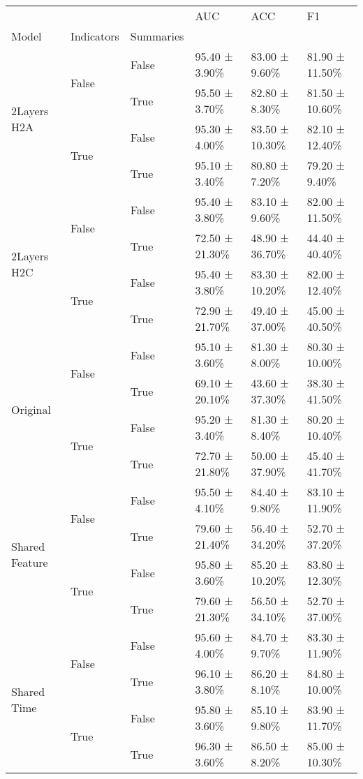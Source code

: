 \begin{tabular}{llllll}
\toprule
 &  &  & AUC & ACC & F1 \\
Model & Indicators & Summaries &  &  &  \\
\midrule
\multirow[t]{4}{*}{2Layers H2A} & \multirow[t]{2}{*}{False} & False & 95.40 ± 3.90\% & 83.00 ± 9.60\% & 81.90 ± 11.50\% \\
 &  & True & 95.50 ± 3.70\% & 82.80 ± 8.30\% & 81.50 ± 10.60\% \\
\cline{2-6}
 & \multirow[t]{2}{*}{True} & False & 95.30 ± 4.00\% & 83.50 ± 10.30\% & 82.10 ± 12.40\% \\
 &  & True & 95.10 ± 3.40\% & 80.80 ± 7.20\% & 79.20 ± 9.40\% \\
\cline{1-6} \cline{2-6}
\multirow[t]{4}{*}{2Layers H2C} & \multirow[t]{2}{*}{False} & False & 95.40 ± 3.80\% & 83.10 ± 9.60\% & 82.00 ± 11.50\% \\
 &  & True & 72.50 ± 21.30\% & 48.90 ± 36.70\% & 44.40 ± 40.40\% \\
\cline{2-6}
 & \multirow[t]{2}{*}{True} & False & 95.40 ± 3.80\% & 83.30 ± 10.20\% & 82.00 ± 12.40\% \\
 &  & True & 72.90 ± 21.70\% & 49.40 ± 37.00\% & 45.00 ± 40.50\% \\
\cline{1-6} \cline{2-6}
\multirow[t]{4}{*}{Original} & \multirow[t]{2}{*}{False} & False & 95.10 ± 3.60\% & 81.30 ± 8.00\% & 80.30 ± 10.00\% \\
 &  & True & 69.10 ± 20.10\% & 43.60 ± 37.30\% & 38.30 ± 41.50\% \\
\cline{2-6}
 & \multirow[t]{2}{*}{True} & False & 95.20 ± 3.40\% & 81.30 ± 8.40\% & 80.20 ± 10.40\% \\
 &  & True & 72.70 ± 21.80\% & 50.00 ± 37.90\% & 45.40 ± 41.70\% \\
\cline{1-6} \cline{2-6}
\multirow[t]{4}{*}{Shared Feature} & \multirow[t]{2}{*}{False} & False & 95.50 ± 4.10\% & 84.40 ± 9.80\% & 83.10 ± 11.90\% \\
 &  & True & 79.60 ± 21.40\% & 56.40 ± 34.20\% & 52.70 ± 37.20\% \\
\cline{2-6}
 & \multirow[t]{2}{*}{True} & False & 95.80 ± 3.60\% & 85.20 ± 10.20\% & 83.80 ± 12.30\% \\
 &  & True & 79.60 ± 21.30\% & 56.50 ± 34.10\% & 52.70 ± 37.00\% \\
\cline{1-6} \cline{2-6}
\multirow[t]{4}{*}{Shared Time} & \multirow[t]{2}{*}{False} & False & 95.60 ± 4.00\% & 84.70 ± 9.70\% & 83.30 ± 11.90\% \\
 &  & True & 96.10 ± 3.80\% & 86.20 ± 8.10\% & 84.80 ± 10.00\% \\
\cline{2-6}
 & \multirow[t]{2}{*}{True} & False & 95.80 ± 3.60\% & 85.10 ± 9.80\% & 83.90 ± 11.70\% \\
 &  & True & 96.30 ± 3.60\% & 86.50 ± 8.20\% & 85.00 ± 10.30\% \\
\cline{1-6} \cline{2-6}
\bottomrule
\end{tabular}

